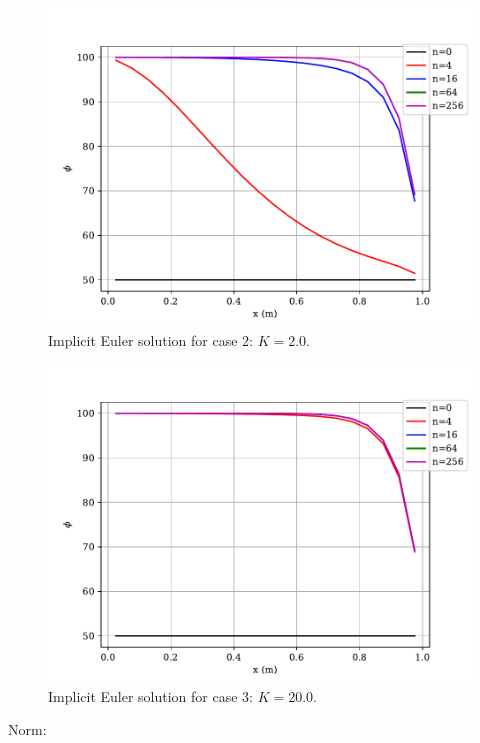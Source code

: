 \documentclass[12pt]{article}
\begin{document}
\begin{figure}[htbp]
    \centering
    \includegraphics[width=\textwidth]{plots/graph_IE_case2.pdf}
    \caption{Implicit Euler solution for case 2: $K=2.0$.}
    \label{fig:ie2}
\end{figure}

\begin{figure}[htbp]
    \centering
    \includegraphics[width=\textwidth]{plots/graph_IE_case3.pdf}
    \caption{Implicit Euler solution for case 3: $K=20.0$.}
    \label{fig:ie3}
\end{figure}


Norm:



\clearpage
\end{document}
